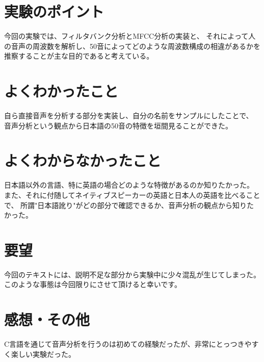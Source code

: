 \documentclass[11pt,a4paper, uplatex]{jsarticle}
\begin{document}
\section{実験のポイント}

今回の実験では、フィルタバンク分析とMFCC分析の実装と、
それによって人の音声の周波数を解析し、50音によってどのような周波数構成の相違があるかを
推察することが主な目的であると考えている。

\section{よくわかったこと}

自ら直接音声を分析する部分を実装し、自分の名前をサンプルにしたことで、
音声分析という観点から日本語の50音の特徴を垣間見ることができた。

\section{よくわからなかったこと}

日本語以外の言語、特に英語の場合どのような特徴があるのか知りたかった。
また、それに付随してネイティブスピーカーの英語と日本人の英語を比べることで、
所謂"日本語訛り"がどの部分で確認できるか、音声分析の観点から知りたかった。

\section{要望}

今回のテキストには、説明不足な部分から実験中に少々混乱が生じてしまった。
このような事態は今回限りにさせて頂けると幸いです。

\section{感想・その他}

C言語を通じて音声分析を行うのは初めての経験だったが、非常にとっつきやすく楽しい実験だった。
\end{document}
